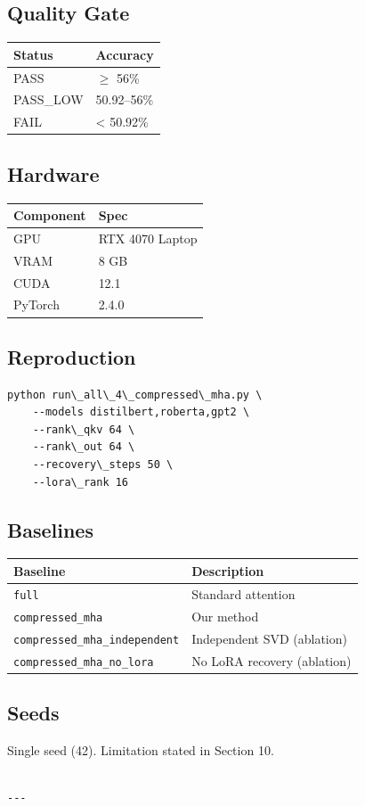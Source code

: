 \subsection{Quality Gate}

\begin{table}[H]
\centering
\small
\begin{tabular}{ll}
\toprule
\textbf{Status} & \textbf{Accuracy} \\
\midrule
PASS & $\ge$ 56\% \\
PASS\_LOW & 50.92--56\% \\
FAIL & \textless{} 50.92\% \\
\bottomrule
\end{tabular}
\end{table}

\subsection{Hardware}

\begin{table}[H]
\centering
\small
\begin{tabular}{ll}
\toprule
\textbf{Component} & \textbf{Spec} \\
\midrule
GPU & RTX 4070 Laptop \\
VRAM & 8 GB \\
CUDA & 12.1 \\
PyTorch & 2.4.0 \\
\bottomrule
\end{tabular}
\end{table}

\subsection{Reproduction}

\begin{lstlisting}
python run\_all\_4\_compressed\_mha.py \
    --models distilbert,roberta,gpt2 \
    --rank\_qkv 64 \
    --rank\_out 64 \
    --recovery\_steps 50 \
    --lora\_rank 16
\end{lstlisting}

\subsection{Baselines}

\begin{table}[H]
\centering
\small
\begin{tabular}{ll}
\toprule
\textbf{Baseline} & \textbf{Description} \\
\midrule
\texttt{full} & Standard attention \\
\texttt{compressed\_mha} & Our method \\
\texttt{compressed\_mha\_independent} & Independent SVD (ablation) \\
\texttt{compressed\_mha\_no\_lora} & No LoRA recovery (ablation) \\
\bottomrule
\end{tabular}
\end{table}

\subsection{Seeds}

Single seed (42). Limitation stated in Section 10.
\begin{lstlisting}

---
\end{lstlisting}